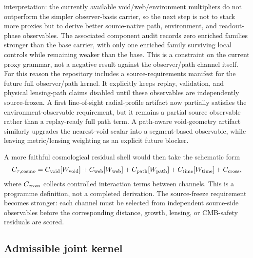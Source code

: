 \documentclass[11pt]{article}
\begin{document}
interpretation: the currently available void/web/environment multipliers do not
outperform the simpler observer-basis carrier, so the next step is not to stack
more proxies but to derive better source-native path, environment, and
readout-phase observables.  The associated component audit records zero
enriched families stronger than the base carrier, with only one enriched family
surviving local controls while remaining weaker than the base.  This is a
constraint on the current proxy grammar, not a negative result against the
observer/path channel itself.
For this reason the repository includes a source-requirements manifest for the
future full observer/path kernel.  It explicitly keeps replay, validation, and
physical lensing-path claims disabled until these observables are independently
source-frozen.  A first line-of-sight radial-profile artifact now partially
satisfies the environment-observable requirement, but it remains a partial
source observable rather than a replay-ready full path term.  A path-aware
void-geometry artifact similarly upgrades the nearest-void scalar into a
segment-based observable, while leaving metric/lensing weighting as an explicit
future blocker.

A more faithful cosmological residual shell would then take the schematic form
\begin{equation}
C_{\tau,\mathrm{cosmo}}
=
C_{\rm void}[W_{\rm void}]
+C_{\rm web}[W_{\rm web}]
+C_{\rm path}[W_{\rm path}]
+C_{\rm time}[W_{\rm time}]
+C_{\rm cross},
\end{equation}
where \(C_{\rm cross}\) collects controlled interaction terms between channels.
This is a programme definition, not a completed derivation. The source-freeze
requirement becomes stronger: each channel must be selected from independent
source-side observables before the corresponding distance, growth, lensing, or
CMB-safety residuals are scored.

\subsection{Admissible joint kernel}
\end{document}
